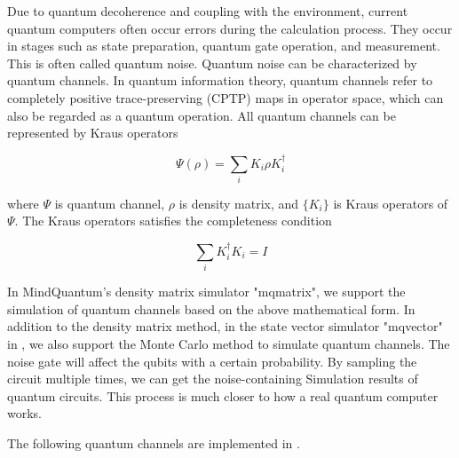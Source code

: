 Due to quantum decoherence and coupling with the environment, current quantum computers often occur errors during the calculation process. They occur in stages such as state preparation, quantum gate operation, and measurement. This is often called quantum noise. Quantum noise can be characterized by quantum channels. In quantum information theory, quantum channels refer to completely positive trace-preserving (CPTP) maps in operator space, which can also be regarded as a quantum operation. All quantum channels can be represented by Kraus operators

\begin{equation}
    \Psi(\rho) = \sum_i K_i \rho K_i^\dagger
\end{equation}

where $\Psi$ is quantum channel, $\rho$ is density matrix, and $\{K_i\}$ is Kraus operators of $\Psi$. The Kraus operators satisfies the completeness condition

\begin{equation}
    \sum_i K_i^\dagger K_i = I
\end{equation}

In MindQuantum's density matrix simulator "mqmatrix", we support the simulation of quantum channels based on the above mathematical form. In addition to the density matrix method, in the state vector simulator "mqvector" in \MindQuantum, we also support the Monte Carlo method to simulate quantum channels. The noise gate will affect the qubits with a certain probability. By sampling the circuit multiple times, we can get the noise-containing Simulation results of quantum circuits. This process is much closer to how a real quantum computer works.

The following quantum channels are implemented in \MindQuantum.

